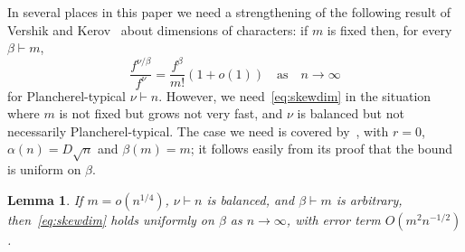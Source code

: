 \documentclass[12pt]%
{amsart}
\newcommand{\al}{{\alpha}}
\theoremstyle{plain}
\newtheorem{lemma}[theorem]{Lemma}
\theoremstyle{definition}
\theoremstyle{remark}
\newcommand{\todo}[1]{\vspace{5 mm}\par \noindent
	\marginpar{\textsc{ToDo}} \framebox{\begin{minipage}[c]{0.95
				\textwidth}
			#1 \end{minipage}}\vspace{5 mm}\par}
\begin{document}
In several places in this paper we need a strengthening of the following result of Vershik and Kerov~\cite{VershikKerovChar} about dimensions of characters: 
if $m$ is fixed then, for every $\beta\vdash m$,
\begin{equation}\label{eq:skewdim}
    \frac{f^{\nu/\beta}}{f^\nu} 
    = \frac{f^\beta}{m!}(1+o(1))
    \quad \text{as} \quad n \to \infty
\end{equation}
for Plancherel-typical $\nu \vdash n$.
However, we need~\eqref{eq:skewdim} in the situation where $m$ is not fixed but grows not very fast, and $\nu$ is balanced but not necessarily Plancherel-typical. 
%
The case we need is covered by~\cite[Theorem 7]{DousseFeray}, with $r = 0$, $\al(n) = D \sqrt n$ and $\beta(m) = m$; it follows easily from its proof that the bound is uniform on $\beta$. 

\begin{lemma}\label{lem:strong_Vershik_Kerov}
    If $m = o(n^{1/4})$, $\nu \vdash n$ is balanced, and $\beta \vdash m$ is arbitrary, then~\eqref{eq:skewdim} holds
    uniformly on $\beta$ as $n \to \infty$,
    with error term $O(m^{2}n^{-1/2})$.
\end{lemma}


\end{document}
